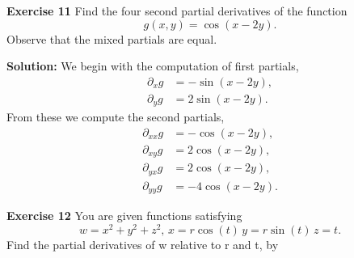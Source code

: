 \documentclass[12pt,oneside]{exam}
\newenvironment{exercise}[1]{\vspace{.1in}\noindent\textbf{Exercise #1 \hspace{.05em}}}{}
\newenvironment{newsolution}{\vspace{.1in}\noindent\textbf{Solution: \hspace{.05em}}}{}
\begin{document}
\begin{exercise}{11}
Find the four second partial derivatives of the function
\begin{equation*}
g(x,y) = \cos(x-2y).
\end{equation*}
Observe that the mixed partials are equal.
\end{exercise}

\begin{newsolution}
We begin with the computation of first partials, 
\begin{align*}
\partial_x g & = -\sin(x-2y),\\
\partial_y g & = 2\sin(x-2y).
\end{align*}
From these we compute the second partials, 
\begin{align*}
\partial_{xx} g & = -\cos(x-2y),\\
\partial_{xy} g & = 2\cos(x-2y),\\
\partial_{yx} g & = 2\cos(x-2y),\\
\partial_{yy} g & = -4\cos(x-2y).
\end{align*}
\end{newsolution}


\begin{exercise}{12}
You are given functions satisfying 
\begin{equation*}
w=x^2+y^2+z^2, \,  x=r\cos(t)  \,  y=r\sin(t) \, z=t.
\end{equation*}
Find the partial derivatives of w relative to r and t, by
\end{exercise}
\end{document}
